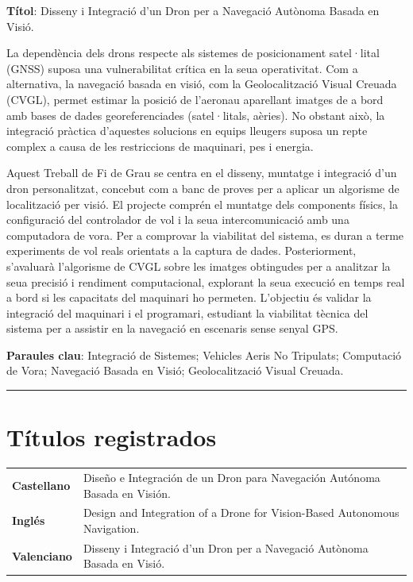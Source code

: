 \begin{otherlanguage}{catalan}

\noindent\textbf{Títol}: Disseny i Integració d'un Dron per a Navegació Autònoma Basada en Visió.

La dependència dels drons respecte als sistemes de posicionament satel·lital (GNSS) suposa una vulnerabilitat crítica en la seua operativitat. Com a alternativa, la navegació basada en visió, com la Geolocalització Visual Creuada (CVGL), permet estimar la posició de l'aeronau aparellant imatges de a bord amb bases de dades georeferenciades (satel·litals, aèries). No obstant això, la integració pràctica d'aquestes solucions en equips lleugers suposa un repte complex a causa de les restriccions de maquinari, pes i energia.

Aquest Treball de Fi de Grau se centra en el disseny, muntatge i integració d'un dron personalitzat, concebut com a banc de proves per a aplicar un algorisme de localització per visió. El projecte comprén el muntatge dels components físics, la configuració del controlador de vol i la seua intercomunicació amb una computadora de vora. Per a comprovar la viabilitat del sistema, es duran a terme experiments de vol reals orientats a la captura de dades. Posteriorment, s'avaluarà l'algorisme de CVGL sobre les imatges obtingudes per a analitzar la seua precisió i rendiment computacional, explorant la seua execució en temps real a bord si les capacitats del maquinari ho permeten. L'objectiu és validar la integració del maquinari i el programari, estudiant la viabilitat tècnica del sistema per a assistir en la navegació en escenaris sense senyal GPS.

\textbf{Paraules clau}: Integració de Sistemes; Vehicles Aeris No Tripulats; Computació de Vora; Navegació Basada en Visió; Geolocalització Visual Creuada.

\end{otherlanguage}

\medskip
\rule{\textwidth}{0.5pt}

\section*{Títulos registrados}

\begin{tabularx}{\textwidth}{>{\bfseries}p{}X}
Castellano & Diseño e Integración de un Dron para Navegación Autónoma Basada en Visión.\\
Inglés & Design and Integration of a Drone for Vision-Based Autonomous Navigation.\\
Valenciano & Disseny i Integració d'un Dron per a Navegació Autònoma Basada en Visió.\\
\end{tabularx}

